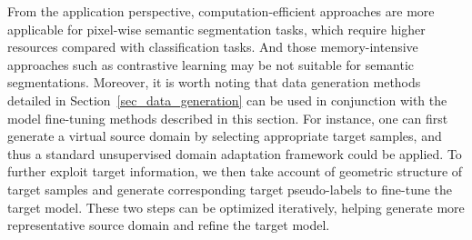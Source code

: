 \documentclass[10pt,journal,compsoc]{IEEEtran}
\begin{document}
From the application perspective, computation-efficient approaches are more applicable for pixel-wise semantic segmentation tasks, which require higher resources compared with classification tasks. 
And those memory-intensive approaches such as contrastive learning may be not suitable for semantic segmentations.
Moreover, it is worth noting that data generation methods detailed in Section~\ref{sec_data_generation} can be used in conjunction with the model fine-tuning methods described in this section.
For instance, one can first generate a virtual source domain by selecting appropriate target samples, and thus a standard unsupervised domain adaptation framework could be applied.
To further exploit target information, we then take account of geometric structure of target samples and generate corresponding target pseudo-labels to fine-tune the target model.
These two steps can be optimized iteratively, helping generate more representative source domain and refine the target model.


        



\end{document}
